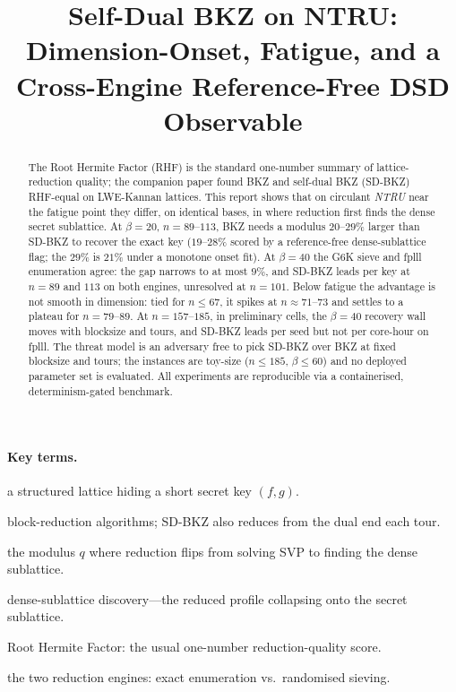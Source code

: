\documentclass[journal=cic,version=preprint]{iacrj}
\title[running={SD-BKZ on NTRU}]{Self-Dual BKZ on NTRU: Dimension-Onset, Fatigue, and a Cross-Engine Reference-Free DSD Observable}
\begin{document}
\maketitle

\begin{abstract}
The Root Hermite Factor (RHF) is the standard one-number summary of
lattice-reduction quality; the companion paper found BKZ and self-dual BKZ
(SD-BKZ) RHF-equal on LWE-Kannan lattices. This report shows that on
circulant \emph{NTRU} near the fatigue point they differ, on identical bases,
in where reduction first finds the dense secret sublattice. At $\beta=20$,
$n=89$--$113$, BKZ needs a modulus $20$--$29\%$ larger than SD-BKZ to recover
the exact key ($19$--$28\%$ scored by a reference-free dense-sublattice
flag; the $29\%$ is $21\%$ under a monotone onset fit). At $\beta=40$ the G6K sieve and fplll enumeration agree: the gap
narrows to at most $9\%$, and SD-BKZ leads per key at $n=89$ and $113$ on
both engines, unresolved at $n=101$. Below fatigue the advantage is not smooth in
dimension: tied for $n\!\le\!67$, it spikes at $n\!\approx\!71$--$73$ and
settles to a plateau for $n=79$--$89$. At $n=157$--$185$, in preliminary
cells, the $\beta=40$ recovery wall moves with blocksize and tours, and
SD-BKZ leads per seed but not per core-hour on fplll. The threat model is an
adversary free to pick SD-BKZ over BKZ at fixed blocksize and tours; the
instances are toy-size ($n\le185$, $\beta\le60$) and no deployed parameter
set is evaluated. All experiments are reproducible via a containerised,
determinism-gated benchmark.
\end{abstract}

\paragraph{Key terms.}
\begin{description}
\setlength{\itemsep}{0pt}
\item[\textnormal{\emph{NTRU lattice}}] a structured lattice hiding a short secret key $(f,g)$.
\item[\textnormal{\emph{BKZ / SD-BKZ}}] block-reduction algorithms; SD-BKZ also reduces from the dual end each tour.
\item[\textnormal{\emph{Fatigue point}}] the modulus $q$ where reduction flips from solving SVP to finding the dense sublattice.
\item[\textnormal{\emph{DSD}}] dense-sublattice discovery---the reduced profile collapsing onto the secret sublattice.
\item[\textnormal{\emph{RHF}}] Root Hermite Factor: the usual one-number reduction-quality score.
\item[\textnormal{\emph{fplll / G6K}}] the two reduction engines: exact enumeration vs.\ randomised sieving.
\end{description}
\end{document}
